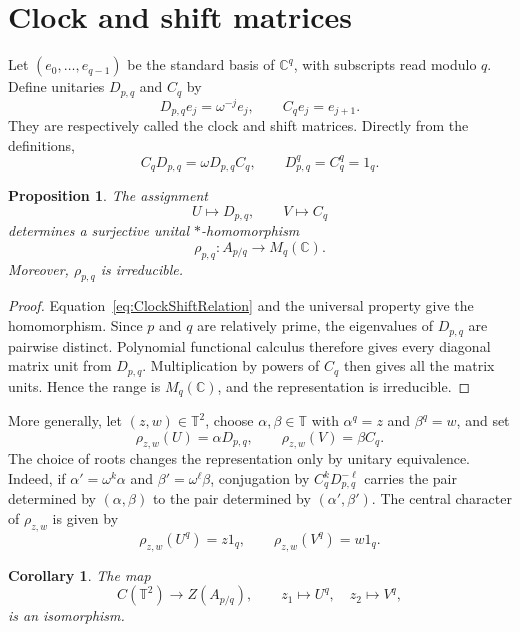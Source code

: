 \documentclass{book}
\newtheorem{proposition}[definition]{Proposition}
\newtheorem{corollary}[definition]{Corollary}
\begin{document}
\section{Clock and shift matrices}

Let \((e_0,\ldots,e_{q-1})\) be the standard basis of \(\mathbb C^q\), with
subscripts read modulo \(q\).  Define unitaries \(D_{p,q}\) and \(C_q\) by
\[
  D_{p,q}e_j=\omega^{-j}e_j,
  \qquad
  C_qe_j=e_{j+1}.
\]
They are respectively called the \textnormal{clock} and
\textnormal{shift} matrices.  Directly from the definitions,
\begin{equation}\label{eq:ClockShiftRelation}
  C_qD_{p,q}=\omega D_{p,q}C_q,
  \qquad
  D_{p,q}^q=C_q^q=1_q.
\end{equation}

\begin{proposition}\label{prop:ClockShiftFibre}
  The assignment
  \[
    U\longmapsto D_{p,q},
    \qquad
    V\longmapsto C_q
  \]
  determines a surjective unital \(*\)-homomorphism
  \[
    \rho_{p,q}\colon A_{p/q}\longrightarrow M_q(\mathbb C).
  \]
  Moreover, \(\rho_{p,q}\) is irreducible.
\end{proposition}

\begin{proof}
  Equation~\eqref{eq:ClockShiftRelation} and the universal property give
  the homomorphism.  Since \(p\) and \(q\) are relatively prime, the
  eigenvalues of \(D_{p,q}\) are pairwise distinct.  Polynomial functional
  calculus therefore gives every diagonal matrix unit from
  \(D_{p,q}\).  Multiplication by powers of \(C_q\) then gives all the
  matrix units.  Hence the range is \(M_q(\mathbb C)\), and the
  representation is irreducible.
\end{proof}

More generally, let \((z,w)\in\mathbb T^2\), choose \(\alpha,\beta\in
\mathbb T\) with \(\alpha^q=z\) and \(\beta^q=w\), and set
\[
  \rho_{z,w}(U)=\alpha D_{p,q},
  \qquad
  \rho_{z,w}(V)=\beta C_q.
\]
The choice of roots changes the representation only by unitary equivalence.
Indeed, if \(\alpha'=\omega^k\alpha\) and
\(\beta'=\omega^\ell\beta\), conjugation by
\(C_q^kD_{p,q}^{-\ell}\) carries the pair determined by
\((\alpha,\beta)\) to the pair determined by \((\alpha',\beta')\).
The central character of \(\rho_{z,w}\) is given by
\[
  \rho_{z,w}(U^q)=z1_q,
  \qquad
  \rho_{z,w}(V^q)=w1_q.
\]

\begin{corollary}\label{cor:RationalRotationCentreSpectrum}
  The map
  \[
    C(\mathbb T^2)\longrightarrow Z(A_{p/q}),
    \qquad
    z_1\longmapsto U^q,
    \quad z_2\longmapsto V^q,
  \]
  is an isomorphism.
\end{corollary}
\end{document}
